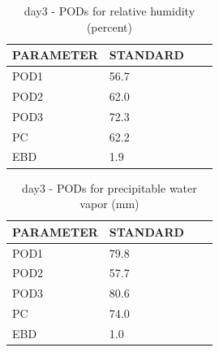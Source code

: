 \begin{table}[p!]
\begin{center}
\begin{tabular}{|l|l|l|l|}
\hline
\multicolumn{1}{|c|}{\cellcolor[HTML]{C0C0C0}\textbf{PARAMETER}} & \multicolumn{1}{c|}{\cellcolor[HTML]{C0C0C0}\textbf{STANDARD}} \\
\hline
\cellcolor[HTML]{C0C0C0}POD1  & 56.7                                \\
\cellcolor[HTML]{C0C0C0}POD2  & 62.0                                \\
\cellcolor[HTML]{C0C0C0}POD3  & 72.3                                \\
\cellcolor[HTML]{C0C0C0}PC    & 62.2                                  \\
\cellcolor[HTML]{C0C0C0}EBD   & 1.9                                 \\
\hline
\end{tabular}
\caption{day3 - PODs for relative humidity (percent)}
\label{tab:podrh:day3}
\end{center}
\end{table}
\begin{table}[p!]
\begin{center}
\begin{tabular}{|l|l|l|l|}
\hline
\multicolumn{1}{|c|}{\cellcolor[HTML]{C0C0C0}\textbf{PARAMETER}} & \multicolumn{1}{c|}{\cellcolor[HTML]{C0C0C0}\textbf{STANDARD}} \\
\hline
\cellcolor[HTML]{C0C0C0}POD1  & 79.8                                \\
\cellcolor[HTML]{C0C0C0}POD2  & 57.7                                \\
\cellcolor[HTML]{C0C0C0}POD3  & 80.6                                \\
\cellcolor[HTML]{C0C0C0}PC    & 74.0                                  \\
\cellcolor[HTML]{C0C0C0}EBD   & 1.0                                 \\
\hline
\end{tabular}
\caption{day3 - PODs for precipitable water vapor (mm)}
\label{tab:podpwv:day3}
\end{center}
\end{table}
